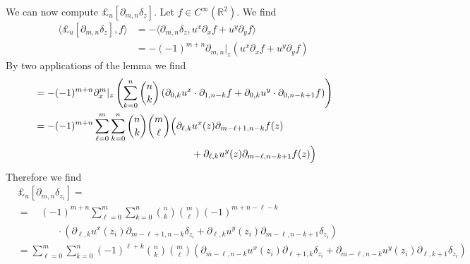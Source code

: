 \documentclass[12pt]{amsart}
\newcommand{\R}{\ensuremath{\mathbb{R}}}
\begin{document}
We can now compute $\pounds_u[\partial_{m,n} \delta_z]$.
Let $f \in C^\infty(\R^2)$.  We find
\begin{align*}
  \langle \pounds_u [\partial_{m,n} \delta_z] , f \rangle 
  &= -\langle \partial_{m,n} \delta_z , u^x \partial_x f + u^y \partial_y f \rangle \\
  &= -(-1)^{m+n} \partial_{m,n}|_{z} \left( u^x \partial_x f + u^y \partial_y f \right)
\end{align*}
By two applications of the lemma we find
\begin{align*}
  &= -(-1)^{m+n} \partial_x^m|_z \left( \sum_{k=0}^{n} \binom{n}{k}
    \left(\partial_{0,k} u^x \cdot \partial_{1,n-k} f + \partial_{0,k} u^y \cdot \partial_{0,n-k+1} f \right)
    \right) \\
  &= -(-1)^{m+n} \sum_{\ell=0}^{m} \sum_{k=0}^{n} \binom{n}{k}\binom{m}{\ell}
    \Big(\partial_{\ell,k} u^x(z) \partial_{m-\ell+1,n-k} f(z) \\
     &\hskip 16em + \partial_{\ell,k} u^y(z) \partial_{m-\ell,n-k+1} f(z)
    \Big)
\end{align*}
Therefore we find
\begin{align*}
  &\pounds_u[ \partial_{m,n} \delta_{z_i}] =\\
  &=\quad (-1)^{m+n} \sum_{\ell=0}^m \sum_{k=0}^n \binom{n}{k} \binom{m}{\ell} (-1)^{m+n-\ell-k}\\
  & \qquad \qquad \cdot \left(\partial_{\ell,k}u^x(z_i) \partial_{m-\ell+1,n-k} \delta_{z_i}
     +\partial_{\ell,k}u^y(z_i) \partial_{m-\ell,n-k+1} \delta_{z_i}
     \right) \\
  &=\sum_{\ell=0}^m \sum_{k=0}^n (-1)^{\ell + k}\binom{n}{k} \binom{m}{\ell}
   \left(\partial_{m-\ell,n-k}u^x(z_i) \partial_{\ell+1,k} \delta_{z_i}
     +\partial_{m-\ell,n-k}u^y(z_i) \partial_{\ell,k+1} \delta_{z_i}
     \right) 
\end{align*}



\end{document}
